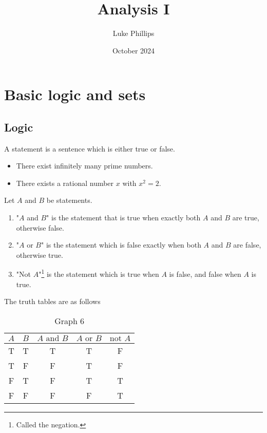 \documentclass[10pt, a4paper]{article}
\title{Analysis I}
\author{Luke Phillips}
\date{October 2024}
\begin{document}
\maketitle

\newpage

\section{Basic logic and sets}

\subsection{Logic}
\begin{definition}
    A statement is a sentence which is either true or false.
\end{definition}
\begin{example}
    \phantom{}
    \begin{itemize}
        \item There exist infinitely many prime numbers.
        \item There exists a rational number $x$ with $x ^ 2 = 2$.
    \end{itemize}
\end{example}

\begin{definition}
    Let $A$ and $B$ be statements.
    \begin{enumerate}[label = (\alph*)]
        \item "$A$ and $B$" is the statement that is true when exactly both $A$ and $B$ are true, otherwise false.
        \item "$A$ or $B$" is the statement which is false exactly when both $A$ and $B$ are false, otherwise true.
        \item "Not $A$"\footnote{Called the negation.} is the statement which is true when $A$ is false, and false when $A$ is true.
    \end{enumerate}

    The truth tables are as follows 
    \begin{table}[h!]
        \centering
        \begin{tabular}{|c|c|c|c|c|}
            \hline
            $A$ & $B$ & $A \text{ and } B$ & $A \text{ or } B$ & $\text{not } A$ \\
            \hline
            T & T & T & T & F \\
            T & F & F & T & F \\
            F & T & F & T & T \\
            F & F & F & F & T \\
            \hline
        \end{tabular}
        \caption{Graph 6}
        \label{tab:Gr6}
    \end{table}
\end{definition}
\end{document}
